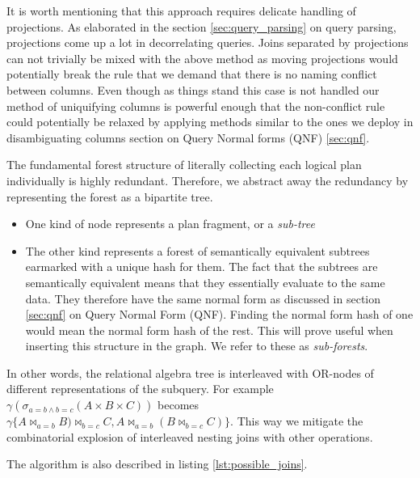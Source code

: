 It is worth mentioning that this approach requires delicate
handling of projections. As elaborated in the section
\ref{sec:query_parsing} on query parsing, projections come up a lot in
decorrelating queries. Joins separated by projections can not
trivially be mixed with the above method as moving projections would
potentially break the rule that we demand that there is no naming
conflict between columns. Even though as things stand this case is not
handled our method of uniquifying columns is powerful enough that the
non-conflict rule could potentially be relaxed by applying methods
similar to the ones we deploy in disambiguating columns section on
Query Normal forms (QNF) \ref{sec:qnf}.

The fundamental forest structure of literally collecting each logical
plan individually is highly redundant. Therefore, we abstract away the
redundancy by representing the forest as a bipartite tree.

\begin{itemize}
\item One kind of node represents a plan fragment, or a \emph{sub-tree}
\item The other kind represents a forest of semantically equivalent
  subtrees earmarked with a unique hash for them. The fact that the
  subtrees are semantically equivalent means that they essentially
  evaluate to the same data. They therefore have the same normal form
  as discussed in section \ref{sec:qnf} on  Query Normal Form (QNF). Finding the normal form
  hash of one would mean the normal form hash of the rest. This will
  prove useful when inserting this structure in the graph. We refer to
  these as \emph{sub-forests}.
\end{itemize}

In other words, the relational algebra tree is interleaved with
OR-nodes of different representations of the subquery. For example
\(\gamma(\sigma_{a=b \land b=c}(A \times B \times C))\) becomes
\(\gamma\{A \Join_{a=b} B) \Join_{b=c} C, A \Join_{a=b} (B \Join_{b=c}
C)\}\). This way we mitigate the combinatorial explosion of interleaved
nesting joins with other operations.

The algorithm is also described in listing \ref{lst:possible_joins}.

